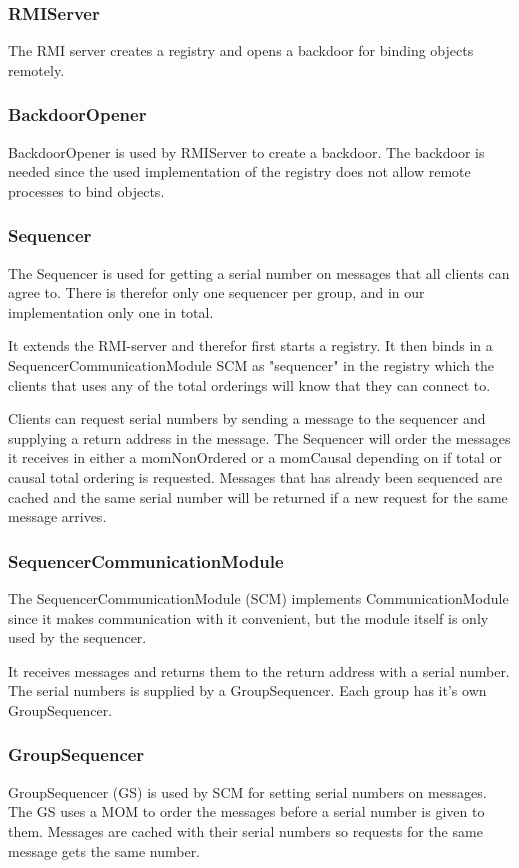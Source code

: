 \documentclass[english]{article}
\begin{document}
\subsubsection{RMIServer}
The RMI server creates a registry and opens a backdoor for binding objects remotely.

\subsubsection{BackdoorOpener}
BackdoorOpener is used by RMIServer to create a backdoor. The backdoor is needed since the used implementation of the registry does not allow remote processes to bind objects.

\subsubsection{Sequencer}
The Sequencer is used for getting a serial number on messages that all clients can agree to. There is therefor only one sequencer per group, and in our implementation only one in total.

It extends the RMI-server and therefor first starts a registry. It then binds in a SequencerCommunicationModule SCM as "sequencer" in the registry which the clients that uses any of the total orderings will know that they can connect to. 

Clients can request serial numbers by sending a message to the sequencer and supplying a return address in the message. The Sequencer will order the messages it receives in either a momNonOrdered or a momCausal depending on if total or causal total ordering is requested. Messages that has already been sequenced are cached and the same serial number will be returned if a new request for the same message arrives.

\subsubsection{SequencerCommunicationModule}
The SequencerCommunicationModule (SCM) implements CommunicationModule since it makes communication with it convenient, but the module itself is only used by the sequencer. 

It receives messages and returns them to the return address with a serial number. The serial numbers is supplied by a GroupSequencer. Each group has it's own GroupSequencer.

\subsubsection{GroupSequencer}
GroupSequencer (GS) is used by SCM for setting serial numbers on messages. The GS uses a MOM to order the messages before a serial number is given to them. Messages are cached with their serial numbers so requests for the same message gets the same number. 
\end{document}
